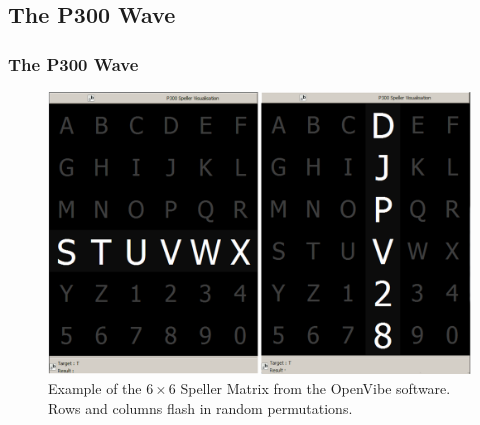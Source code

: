 \documentclass[aspectratio=169]{beamer}
\begin{document}
\subsection{The P300 Wave}
\begin{frame}
\frametitle{The P300 Wave}
\begin{figure}[h!]
\centering
\includegraphics[width=15cm]{images/openvibep300matrix.png}
\caption[P300 Speller Matrix]{Example of the $6 \times 6$ Speller Matrix from the OpenVibe software.  Rows and columns flash in random permutations.}
\label{fig:p300matrix}
\end{figure}

\end{frame}    
\end{document}
